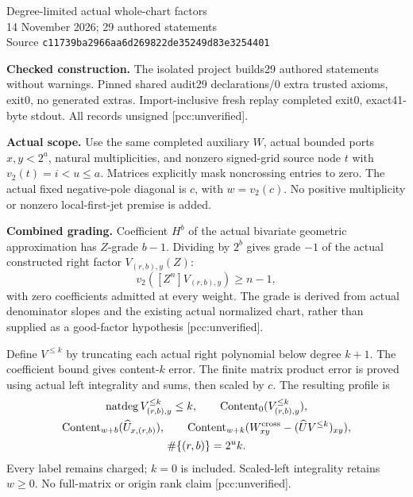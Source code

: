 \documentclass[10pt]{article}
\begin{document}
\begin{center}{\Large Degree-limited actual whole-chart factors}\\[4pt]
14 November 2026; 29 authored statements\\
Source \texttt{c11739ba2966aa6d269822de35249d83e3254401}
\end{center}
\textbf{Checked construction.} The isolated project builds29 authored statements
without warnings. Pinned shared audit29 declarations/0 extra trusted axioms,
exit0, no generated extras. Import-inclusive fresh replay completed exit0, exact41-byte stdout. All records unsigned [pcc:unverified].

\textbf{Actual scope.} Use the same completed auxiliary $W$, actual bounded
ports $x,y<2^a$, natural multiplicities, and nonzero signed-grid source node
$t$ with $v_2(t)=i<u\le a$. Matrices explicitly mask noncrossing entries to
zero. The actual fixed negative-pole diagonal is $c$, with $w=v_2(c)$.
No positive multiplicity or nonzero local-first-jet premise is added.

\textbf{Combined grading.} Coefficient $H^b$ of the actual bivariate
geometric approximation has $Z$-grade $b-1$. Dividing by $2^b$ gives
grade $-1$ of the actual constructed right factor $V_{(r,b),y}(Z)$:
\[
 v_2([Z^n]V_{(r,b),y})\ge n-1,
\]
with zero coefficients admitted at every weight. The grade is derived from
actual denominator slopes and the existing actual normalized chart, rather
than supplied as a good-factor hypothesis [pcc:unverified].

Define $V^{\le k}$ by truncating each actual right polynomial below degree
$k+1$. The coefficient bound gives content-$k$ error. The finite matrix
product error is proved using actual left integrality and sums, then scaled
by $c$. The resulting profile is
\[
 \begin{gathered}
 \operatorname{natdeg}V^{\le k}_{(r,b),y}\le k,\qquad
 \operatorname{Content}_0(V^{\le k}_{(r,b),y}),\\
 \operatorname{Content}_{w+b}(\widehat U_{x,(r,b)}),\qquad
 \operatorname{Content}_{w+k}
   (W^{\rm cross}_{xy}-(\widehat U V^{\le k})_{xy}),\\
 \#\{(r,b)\}=2^u k.
 \end{gathered}
\]
Every label remains charged; $k=0$ is included. Scaled-left integrality
retains $w\ge0$. No full-matrix or origin rank claim [pcc:unverified].
\end{document}
